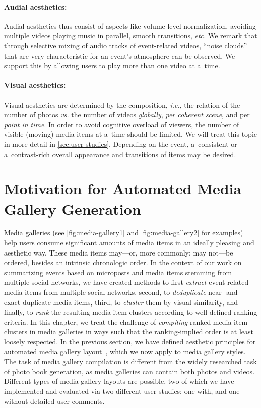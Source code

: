 \paragraph{Audial aesthetics:}

Audial aesthetics thus consist of aspects like volume level normalization,
avoiding multiple videos playing music in parallel, smooth transitions, \emph{etc.}
We remark that through selective mixing of audio tracks
of event-related videos, ``noise clouds''
that are very characteristic
for an event's atmosphere can be observed.
We support this by allowing users to play more than one video at a~time.

\paragraph{Visual aesthetics:}

Visual aesthetics are determined by the composition, \emph{i.e.},
the relation of the number of photos \emph{vs.} the number of videos \emph{globally},
\emph{per coherent scene}, and per \emph{point in time}.
In order to avoid cognitive overload of viewers,
the number of visible (moving) media items
at a~time should be limited.
We will treat this topic in more detail in \autoref{sec:user-studies}.
Depending on the event,
a~consistent or a~contrast-rich overall
appearance and transitions of items may be desired.

\section{Motivation for Automated Media Gallery Generation}
\label{sec:motivation-chapter-8}

Media galleries (see \autoref{fig:media-gallery1} and \autoref{fig:media-gallery2}
for examples)
help users consume significant
amounts of media items in an ideally pleasing and aesthetic way.
These media items may---or, more commonly: may not---be ordered,
besides an intrinsic chronologic order.
In the context of our work on summarizing events
based on microposts and media items stemming from
multiple social networks, we have created methods
to first \emph{extract} event-related media items
from multiple social networks, second, to
\emph{deduplicate} near- and exact-duplicate media items,
third, to \emph{cluster} them by visual similarity, and
finally, to \emph{rank} the resulting media item clusters
according to well-defined ranking criteria.
In this chapter, we treat the challenge of \emph{compiling}
ranked media item clusters in media galleries in ways
such that the ranking-implied order is at least loosely respected.
In the previous section, we have defined
aesthetic principles for automated media gallery layout~\cite{steiner2012definingaesthetic},
which we now apply to media gallery styles.
The task of media gallery compilation is different
from the widely researched task of photo book generation,
as media galleries can contain both photos and videos.
Different types of media gallery layouts are possible,
two of which we have implemented and evaluated via two different user studies:
one with, and one without detailed user comments.

